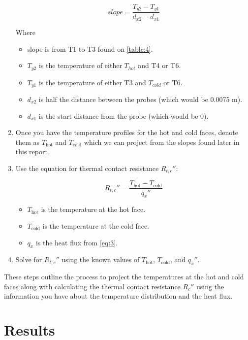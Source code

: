 \documentclass[10pt,twocolumn]{article}
\begin{document}
\begin{enumerate}
\begin{equation}  
\label{eq:3}
slope = \frac{T_{y2}-T_{y1}}{d_{x2}-d_{x1}}
\end{equation}

Where 
\begin{itemize}
\item slope is from T1 to T3 found on \autoref{table:4}.
 \item $T_{y2}$ is the temperature of either $T_{hot}$ and T4 or T6.
 \item $T_{y1}$ is the temperature of either T3 and $T_{cold}$ or T6.
 \item $d_{x2}$ is half the distance between the probes (which would be 0.0075 m).
 \item $d_{x1}$ is the start distance from the probe (which would be 0).
\end{itemize}

  \item  Once you have the temperature profiles for the hot and cold faces, denote them as $T_{\text{hot}}$ and $T_{\text{cold}}$ which we can project from the slopes found later in this report.

  \item  Use the equation for thermal contact resistance $R_{t,c}''$:

\begin{equation}
\label{eq:4}
R_{t,c}'' = \frac{T_{\text{hot}} - T_{\text{cold}}}{q_x''}
\end{equation}

\begin{itemize}
 \item$T_{\text{hot}}$ is the temperature at the hot face.
 \item $T_{\text{cold}}$ is the temperature at the cold face.
 \item $q_x$ is the heat flux from \autoref{eq:3}.
\end{itemize}
  \item  Solve for $R_{t,c}''$ using the known values of $T_{\text{hot}}$, $T_{\text{cold}}$, and $q_x''$.
\end{enumerate}
These steps outline the process to project the temperatures at the hot and cold faces along with calculating the thermal contact resistance $R_c''$ using the information you have about the temperature distribution and the heat flux. 




\section{Results}
\label{sec:results}
\end{document}
